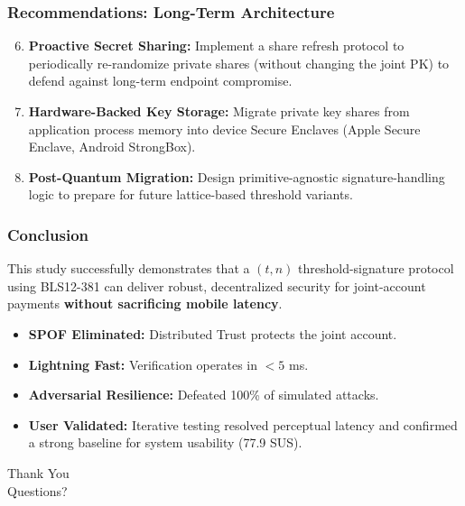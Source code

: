 \documentclass{beamer}
\begin{document}
\begin{frame}
  \frametitle{Recommendations: Long-Term Architecture}
  \begin{enumerate}
      \setcounter{enumi}{5}
      \item \textbf{Proactive Secret Sharing:} Implement a share refresh protocol to periodically re-randomize private shares (without changing the joint PK) to defend against long-term endpoint compromise.
      \item \textbf{Hardware-Backed Key Storage:} Migrate private key shares from application process memory into device Secure Enclaves (Apple Secure Enclave, Android StrongBox).
      \item \textbf{Post-Quantum Migration:} Design primitive-agnostic signature-handling logic to prepare for future lattice-based threshold variants.
  \end{enumerate}
\end{frame}

\begin{frame}
  \frametitle{Conclusion}
  This study successfully demonstrates that a $(t,n)$ threshold-signature protocol using BLS12-381 can deliver robust, decentralized security for joint-account payments \textbf{without sacrificing mobile latency}.
  \vspace{0.3cm}
  \begin{itemize}
      \item \textbf{SPOF Eliminated:} Distributed Trust protects the joint account.
      \item \textbf{Lightning Fast:} Verification operates in $<5$ ms.
      \item \textbf{Adversarial Resilience:} Defeated 100\% of simulated attacks.
      \item \textbf{User Validated:} Iterative testing resolved perceptual latency and confirmed a strong baseline for system usability (77.9 SUS).
  \end{itemize}
\end{frame}

\begin{frame}
  \begin{center}
      \Huge Thank You \\
      \vspace{0.5cm}
      \Large Questions?
  \end{center}
\end{frame}
\end{document}
